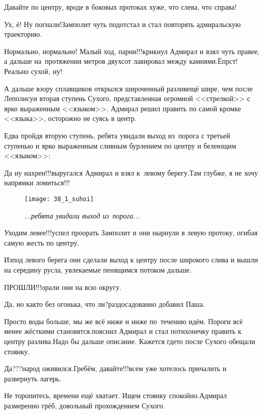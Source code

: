 \diagdash Давайте по центру, вроде в боковых протоках хуже, что слева, что справа!

\diagdash Ух, ё! Ну погнали!\mdash Замполит чуть подотстал и стал повторять адмиральскую траекторию.

\diagdash Нормально, нормально! Малый ход, парни!!!\mdash крикнул Адмирал и взял чуть правее, а дальше на~протяжении метров двухсот лавировал между камнями.\mdash Ёпрст! Реально сухой, ну!

А дальше взору сплавщиков открылся широченный разлив\mdash ещё шире, чем после Леполису\mdash и вторая ступень Сухого, представленная огромной <<стрелкой>> с ярко выраженным <<языком>>. Адмирал решил править по самой кромке <<языка>>, осторожно не суясь в центр.

Едва пройдя вторую ступень, ребята увидали выход из~порога с третьей ступенью и ярко выраженным сливным бурлением по центру и белеющим <<языком>>:

\diagdash Да ну нахрен!!!\mdash выругался Адмирал и взял к~левому берегу.\mdash Там глубже, я не хочу напрямки ломиться!!!

	\begin{figure}[h]
	\centering
	\texttt{[image: 38\_1\_suhoi]}
	\caption{\small\textit{...ребята увидали выход из~порога...}}
	\end{figure}

\diagdash Уходим левее!!!\mdash успел проорать Замполит и они нырнули в левую протоку, огибая самую жесть по центру.

Из\sdash под левого берега они сделали выход к центру после широкого слива и вышли на середину русла, увлекаемые пенящимся потоком дальше.

\diagdash ПРОШЛИ!!!\mdash орали они на всю округу.

\diagdash Да, но как\sdash то без огонька, что ли?\mdash раздосадованно добавил Паша.

\diagdash Просто воды больше, мы же всё ниже и ниже по~течению идём. Пороги всё менее жёсткими становятся.\mdash пояснил Адмирал и стал потихонечку править к центру разлива.\mdash Надо бы дальше описание. Кажется где\sdash то после Сухого обещали стоянку.

\diagdash Да???\mdash народ оживился.\mdash Гребём, давайте!!!\mdash всем уже хотелось причалить и развернуть лагерь.

\diagdash Не торопитесь, времени ещё хватает. Ищем стоянку спокойно.\mdash Адмирал размеренно грёб, довольный прохождением Сухого.

